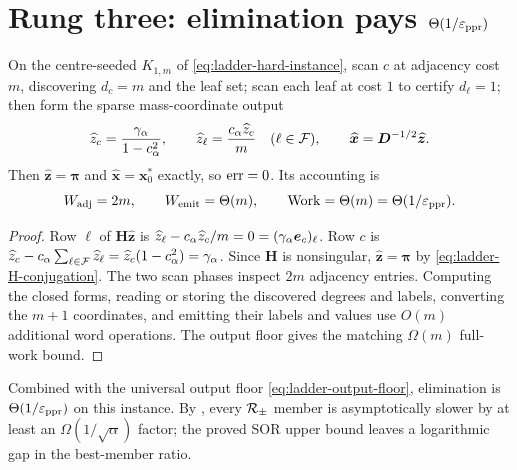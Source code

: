 \section[Rung three: elimination]
{Rung three: elimination pays $\Theta(1/\varepsilon_{\mathrm{ppr}})$}
\label{sec:ladder-elimination}

\begin{proposition}
\label{prop:ladder-elimination}
On the centre-seeded $K_{1,m}$ of \eqref{eq:ladder-hard-instance}, scan $c$
at adjacency cost $m$, discovering $d_c=m$ and the leaf set; scan each leaf at
cost $1$ to certify $d_\ell=1$; then form the sparse mass-coordinate output
\begin{equation}
    \widehat z_c=\frac{\gamma_{\alpha}}{1-c_{\alpha}^2},
    \qquad
    \widehat z_\ell=\frac{c_{\alpha}\widehat z_c}{m}
    \quad(\ell\in\mathcal F),
    \qquad
    \widehat{\bm{x}}=\bm{D}^{-1/2}\widehat{\bm{z}}.
    \label{eq:ladder-elimination-output}
\end{equation}
Then $\widehat{\bm{z}}=\bm{\pi}$ and
$\widehat{\bm{x}}=\bm{x}_0^*$ exactly, so $\operatorname{err}=0$. Its accounting is
\begin{equation}
    W_{\mathrm{adj}}=2m,
    \qquad
    W_{\mathrm{emit}}=\Theta(m),
    \qquad
    \operatorname{Work}=\Theta(m)=\Theta(1/\varepsilon_{\mathrm{ppr}}).
    \label{eq:ladder-elimination-work}
\end{equation}
\end{proposition}

\begin{proof}
Row $\ell$ of $\bm{H}\widehat{\bm{z}}$ is
$\widehat z_\ell-c_{\alpha}\widehat z_c/m
=0=(\gamma_{\alpha}\bm{e}_c)_\ell$. Row $c$ is
$\widehat z_c-c_{\alpha}\sum_{\ell\in\mathcal F}\widehat z_\ell
=\widehat z_c(1-c_{\alpha}^2)=\gamma_{\alpha}$. Since $\bm{H}$ is nonsingular,
$\widehat{\bm{z}}=\bm{\pi}$ by \eqref{eq:ladder-H-conjugation}. The two scan
phases inspect $2m$ adjacency entries. Computing the closed forms, reading or
storing the discovered degrees and labels, converting the $m+1$ coordinates,
and emitting their labels and values use $O(m)$ additional word operations.
The output floor gives the matching $\Omega(m)$ full-work bound.
\end{proof}

Combined with the universal output floor \eqref{eq:ladder-output-floor},
elimination is $\Theta(1/\varepsilon_{\mathrm{ppr}})$ on this instance. By
, every $\mathcal{R}_{\pm}$ member is asymptotically
slower by at least an $\Omega(1/\sqrt\alpha)$ factor; the proved SOR upper
bound leaves a logarithmic gap in the best-member ratio.

